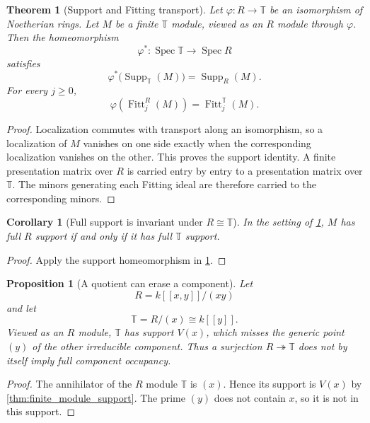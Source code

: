 \documentclass[11pt]{amsart}
\newtheorem{theorem}{Theorem}[section]
\newtheorem{proposition}[proposition]{Proposition}
\newtheorem{corollary}[corollary]{Corollary}
\theoremstyle{definition}
\theoremstyle{remark}
\newcommand{\TT}{\mathbb T}
\newcommand{\Spec}{\operatorname{Spec}}
\newcommand{\Supp}{\operatorname{Supp}}
\newcommand{\Fitt}{\operatorname{Fitt}}
\begin{document}
\begin{theorem}[Support and Fitting transport]\label{thm:rt_support_transport}
Let \(\varphi:R\to\TT\) be an isomorphism of Noetherian rings. Let \(M\) be a finite \(\TT\) module, viewed as an \(R\) module through \(\varphi\). Then the homeomorphism
\[
\varphi^*:\Spec\TT\longrightarrow\Spec R
\]
satisfies
\[
\boxed{
\varphi^*\bigl(\Supp_{\TT}(M)\bigr)
=
\Supp_R(M).
}
\]
For every \(j\geq0\),
\[
\boxed{
\varphi
\left(
\Fitt_j^R(M)
\right)
=
\Fitt_j^{\TT}(M).
}
\]
\end{theorem}

\begin{proof}
Localization commutes with transport along an isomorphism, so a localization of \(M\) vanishes on one side exactly when the corresponding localization vanishes on the other. This proves the support identity. A finite presentation matrix over \(R\) is carried entry by entry to a presentation matrix over \(\TT\). The minors generating each Fitting ideal are therefore carried to the corresponding minors.
\end{proof}

\begin{corollary}[Full support is invariant under \texorpdfstring{\(R\cong\TT\)}{R equals T}]\label{cor:rt_full_support}
In the setting of \cref{thm:rt_support_transport}, \(M\) has full \(R\) support if and only if it has full \(\TT\) support.
\end{corollary}

\begin{proof}
Apply the support homeomorphism in \cref{thm:rt_support_transport}.
\end{proof}

\begin{proposition}[A quotient can erase a component]\label{prop:quotient_erases_component}
Let
\[
R=k[[x,y]]/(xy)
\]
and let
\[
\TT=R/(x)\cong k[[y]].
\]
Viewed as an \(R\) module, \(\TT\) has support \(V(x)\), which misses the generic point \((y)\) of the other irreducible component. Thus a surjection \(R\twoheadrightarrow\TT\) does not by itself imply full component occupancy.
\end{proposition}

\begin{proof}
The annihilator of the \(R\) module \(\TT\) is \((x)\). Hence its support is \(V(x)\) by \cref{thm:finite_module_support}. The prime \((y)\) does not contain \(x\), so it is not in this support.
\end{proof}
\end{document}
